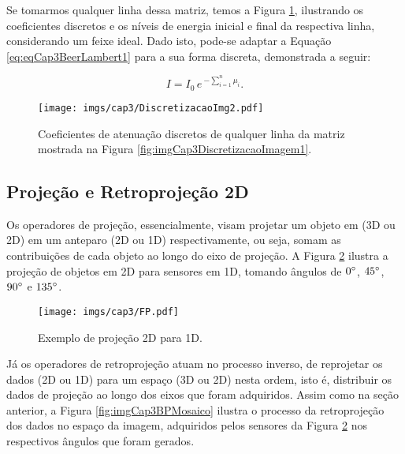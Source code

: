 Se tomarmos qualquer linha dessa matriz, temos a Figura \ref{fig:imgCap3DiscretizacaoImagem2}, ilustrando os coeficientes discretos e os níveis de energia inicial e final da respectiva linha, considerando um feixe ideal. Dado isto, pode-se adaptar a Equação \ref{eq:eqCap3BeerLambert1} para a sua forma discreta, demonstrada a seguir:

\begin{equation}
I = I_{0} \, e \, ^{-\sum_{i=1}^{n} \mu_{i}}.
\label{eq:eqCap3BeerLambertDiscreto1}
\end{equation} 

\begin{figure}[H]
	\caption{Coeficientes de atenuação discretos de qualquer linha da matriz mostrada na Figura \ref{fig:imgCap3DiscretizacaoImagem1}.}
	\begin{center}
		\texttt{[image: imgs/cap3/DiscretizacaoImg2.pdf]}
	\end{center}
	\label{fig:imgCap3DiscretizacaoImagem2}
\end{figure}

\subsection{Projeção e Retroprojeção 2D}

 Os operadores de projeção, essencialmente, visam projetar um objeto em (\acs{3D} ou \acs{2D}) em um anteparo (\acs{2D} ou \acs{1D}) respectivamente, ou seja, somam as contribuições de cada objeto ao longo do eixo de projeção. A Figura \ref{fig:imgCap3ProjeçãoDireta} ilustra a projeção de objetos em \acs{2D} para sensores em \acs{1D}, tomando ângulos de $0\degree$, $45\degree$, $90\degree$ e $135\degree$. 

\begin{figure}[H]
	\caption{Exemplo de projeção \acs{2D} para \acs{1D}.}
	\begin{center}
		\texttt{[image: imgs/cap3/FP.pdf]}
	\end{center}
	\label{fig:imgCap3ProjeçãoDireta}
\end{figure}


Já os operadores de retroprojeção atuam no processo inverso, de reprojetar os dados (\acs{2D} ou \acs{1D}) para um espaço (\acs{3D} ou \acs{2D}) nesta ordem, isto é, distribuir os dados de projeção ao longo dos eixos que foram adquiridos. Assim como na seção anterior, a Figura \ref{fig:imgCap3BPMosaico} ilustra o processo da retroprojeção dos dados no espaço da imagem, adquiridos pelos sensores da Figura \ref{fig:imgCap3ProjeçãoDireta} nos respectivos ângulos que foram gerados. 

